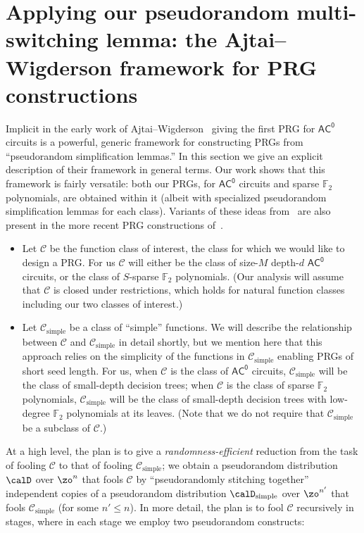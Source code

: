 \documentclass{toc}
\theoremstyle{plain}
\newcommand{\acz}{\mathsf{AC^0}}
\newcommand{\simple}{\mathrm{simple}}
\renewcommand{\F}{\mathds{F}}
\begin{document}
\section{Applying our pseudorandom multi-switching lemma: the Ajtai--Wigderson framework for PRG constructions} 
\label{sec:AW} 

Implicit in the early work of Ajtai--Wigderson~\cite{AjtaiWigderson:85} giving the first PRG for $\acz$ circuits is a powerful, generic framework for constructing PRGs from ``pseudorandom simplification lemmas.'' In this section we give an explicit description of their framework in general terms. Our work shows that this framework is fairly versatile: both our PRGs, for $\acz$ circuits and sparse $\F_2$ polynomials, are obtained within it (albeit with specialized pseudorandom simplification lemmas for each class). Variants of these ideas from~\cite{AjtaiWigderson:85} are also present in the more recent PRG constructions of~\cite{GMRTV12,IMZ12journal,RSV13,TX13,MRT19}.  



\begin{itemize} 
\item Let $\mathscr{C}$ be the function class of interest, the class for which we would like to design a PRG. For us $\mathscr{C}$ will either be the class of size-$M$ depth-$d$ $\acz$ circuits, or the class of $S$-sparse $\F_2$ polynomials. (Our analysis will assume that $\mathscr{C}$ is closed under restrictions, which holds for natural function classes including our two classes of interest.)
\item Let $\mathscr{C}_\simple$ be a class of ``simple'' functions. We will describe the relationship between $\mathscr{C}$ and $\mathscr{C}_\simple$ in detail shortly, but we mention here that this approach relies on the simplicity of the functions in $\mathscr{C}_\simple$ enabling PRGs of short seed length. For us, when $\mathscr{C}$ is the class of $\acz$ circuits, $\mathscr{C}_\simple$ will be the class of small-depth decision trees; when $\mathscr{C}$ is the class of sparse $\F_2$ polynomials, $\mathscr{C}_\simple$ will be the class of small-depth decision trees with low-degree $\F_2$ polynomials at its leaves. (Note that we do not require that $\mathscr{C}_\simple$ be a subclass of $\mathscr{C}$.) 
\end{itemize} 

At a high level, the plan is to give a \emph{randomness-efficient} reduction from the task of fooling $\mathscr{C}$ to that of fooling $\mathscr{C}_\simple$;  we obtain a pseudorandom distribution $\calD$ over $\zo^n$ that fools $\mathscr{C}$ by ``pseudorandomly stitching together'' independent copies of a pseudorandom distribution $\calD_\simple$ over $\zo^{n'}$ that fools $\mathscr{C}_\simple$ (for some $n' \le n$).  In more detail, the plan is to fool $\mathscr{C}$ recursively in stages, where in each stage we employ two pseudorandom constructs: 
\end{document}
